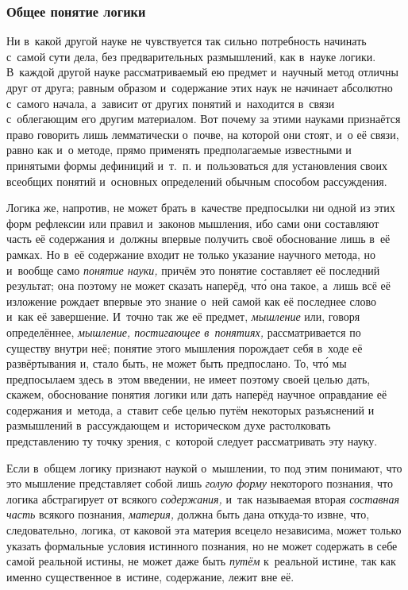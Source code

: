 \subsubsection{Общее понятие логики}
Ни в~какой другой науке не чувствуется так
сильно потребность начинать с~самой сути дела, без предварительных
размышлений, как в~науке логики. В~каждой другой науке рассматриваемый ею
предмет и~научный метод отличны друг от друга; равным образом и~содержание
этих наук не начинает абсолютно с~самого начала, а~зависит от других
понятий и~находится в~связи с~облегающим его другим материалом. Вот почему за этими
науками признаётся право говорить лишь
лемматически о~почве, на которой они стоят, и~о её связи, равно как и~о
методе, прямо применять предполагаемые известными и
принятыми формы дефиниций и~т.~п. и~пользоваться для установления своих
всеобщих понятий и~основных определений обычным способом рассуждения.

Логика же, напротив, не может брать в~качестве предпосылки ни одной из этих
форм рефлексии или правил и~законов мышления, ибо сами они составляют часть
её содержания и~должны впервые получить своё обоснование лишь в~её рамках.
Но в~её содержание входит не только указание научного метода, но и~вообще
само {\em понятие науки,} причём это понятие
составляет её последний результат; она поэтому не может сказать наперёд,
чт\'{о} она такое, а~лишь всё её изложение рождает впервые это знание о~ней
самой как её последнее слово и~как её завершение. И~точно так же её
предмет, {\em мышление} или, говоря определённее,
{\em мышление, постигающее в~понятиях,} рассматривается
по существу внутри неё; понятие этого мышления порождает себя в~ходе её
развёртывания и, стало быть, не может быть предпослано. То, чт\'{о} мы
предпосылаем здесь в~этом введении, не имеет поэтому своей целью дать,
скажем, обоснование понятия логики или дать наперёд научное оправдание её
содержания и~метода, а~ставит себе целью путём некоторых разъяснений и
размышлений в~рассуждающем и~историческом духе растолковать представлению
ту точку зрения, с~которой следует рассматривать эту науку.

Если в~общем логику признают наукой о~мышлении, то под этим понимают, что
это мышление представляет собой лишь {\em голую форму}
некоторого познания, что логика абстрагирует от всякого
{\em содержания,} и~так называемая вторая
{\em составная часть} всякого познания,
{\em материя,} должна быть дана откуда-то извне, что,
следовательно, логика, от каковой эта материя всецело независима, может
только указать формальные условия истинного познания, но не может содержать
в себе самой реальной истины, не может даже быть
{\em путём} к~реальной истине, так как именно
существенное в~истине, содержание, лежит вне её.

